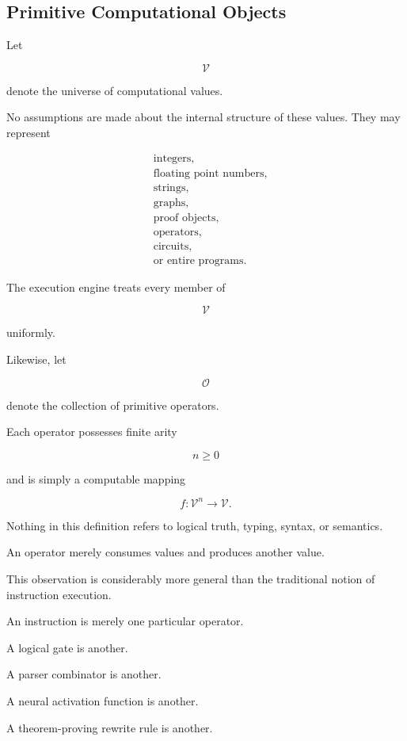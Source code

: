 \documentclass[12pt,oneside]{article}
\begin{document}
\subsection{Primitive Computational Objects}

Let

\[
\mathcal{V}
\]

denote the universe of computational values.

No assumptions are made about the internal structure of these values. They may represent

\[
\begin{aligned}
&\text{integers},\\
&\text{floating point numbers},\\
&\text{strings},\\
&\text{graphs},\\
&\text{proof objects},\\
&\text{operators},\\
&\text{circuits},\\
&\text{or entire programs.}
\end{aligned}
\]

The execution engine treats every member of

\[
\mathcal V
\]

uniformly.

Likewise, let

\[
\mathcal O
\]

denote the collection of primitive operators.

Each operator possesses finite arity

\[
n\ge0
\]

and is simply a computable mapping

\[
f:\mathcal V^n\rightarrow\mathcal V.
\]

Nothing in this definition refers to logical truth, typing, syntax, or semantics.

An operator merely consumes values and produces another value.

This observation is considerably more general than the traditional notion of instruction execution.

An instruction is merely one particular operator.

A logical gate is another.

A parser combinator is another.

A neural activation function is another.

A theorem-proving rewrite rule is another.
\end{document}

